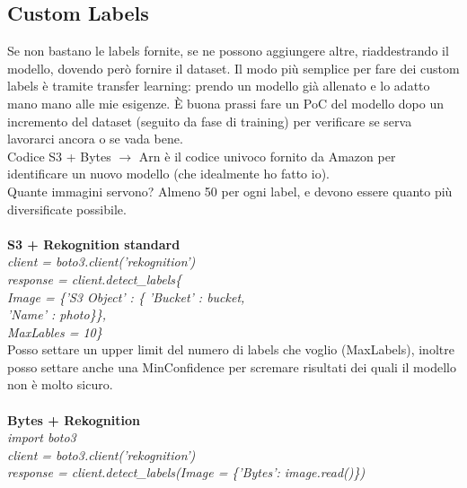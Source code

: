 \documentclass{classes/base}
\begin{document}
    \subsection*{Custom Labels}
    Se non bastano le labels fornite, se ne possono aggiungere altre, riaddestrando il modello, dovendo però fornire il dataset.
    Il modo più semplice per fare dei custom labels è tramite transfer learning: prendo un modello già allenato e lo adatto mano mano alle mie esigenze.
    È buona prassi fare un PoC del modello dopo un incremento del dataset (seguito da fase di training) per verificare se serva lavorarci ancora o se vada bene.\\
    Codice S3 + Bytes $\rightarrow$ Arn è il codice univoco fornito da Amazon per identificare un nuovo modello (che idealmente ho fatto io). \\
    Quante immagini servono? Almeno 50 per ogni label, e devono essere quanto più diversificate possibile. \\ \\
    \textbf{S3 + Rekognition standard} \\
    \textit{client = boto3.client('rekognition') \\
    response = client.detect\_labels\{ \\
                                Image = \{'S3 Object' : \{ 'Bucket' : bucket,\\
                                                        'Name' : photo\}\},\\
                                                    MaxLables = 10\} } \\ 
    Posso settare un upper limit del numero di labels che voglio (MaxLabels), inoltre posso settare anche una MinConfidence per scremare risultati dei quali il modello non è molto sicuro.\\ \\
    \textbf{Bytes + Rekognition} \\
    \textit{import boto3 \\
    client = boto3.client('rekognition') \\
    response = client.detect\_labels(Image = \{'Bytes': image.read()\})}
\end{document}
